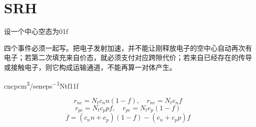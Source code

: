 \section{SRH\allowbreak{}}\label{sec:13}
{\cjkfont 设一个中心空态为}\allowbreak{}0\allowbreak{}1\allowbreak{}f\allowbreak{}
\par
{\cjkfont 四个事件必须一起写。把电子发射加速，并不能让刚释放电子的空中心自动再次有电子；若第二次填充来自价态，就必须支付对应跨隙代价；若来自已经存在的传导或接触电子，则它构成运输通道，不能再算一对体产生。}\allowbreak{}
\par
cn\allowbreak{}cp\allowbreak{}cm\textsuperscript{3}/s\allowbreak{}en\allowbreak{}ep\allowbreak{}s\textsuperscript{−1}\allowbreak{}Nt\allowbreak{}f\allowbreak{}1\allowbreak{}1\allowbreak{}f\allowbreak{}
\par
\begin{equation}
r_{nc}=N_tc_n n(1-f),\quad r_{ne}=N_te_nf
\label{eq:8}\end{equation}
\begin{equation}
r_{pc}=N_tc_p pf,\quad r_{pe}=N_te_p(1-f)
\label{eq:9}\end{equation}
\begin{equation}
\dot f=(c_n n+e_p)(1-f)-(e_n+c_p p)f
\label{eq:10}\end{equation}
